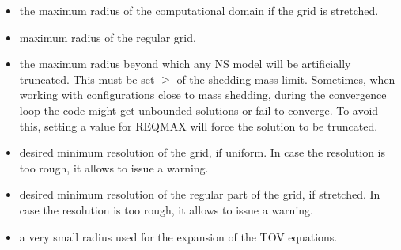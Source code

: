 \documentclass[letterpaper,10pt,english]{sphinxmanual}
\begin{document}
\begin{itemize}
\item {} 
\sphinxAtStartPar
{} \sphinxhyphen{} the maximum radius of the computational domain if the grid is stretched.


\item {} 
\sphinxAtStartPar
{} \sphinxhyphen{} maximum radius of the regular grid.


\item {} 
\sphinxAtStartPar
{} \sphinxhyphen{} the maximum radius beyond which any NS model will be artificially truncated. This must
be set \(\geq\) of the shedding mass limit. Sometimes, when working with configurations close to mass
shedding, during the convergence loop the code might get unbounded solutions or fail to converge. To
avoid this, setting a value for REQMAX will force the solution to be truncated.


\item {} 
\sphinxAtStartPar
{} \sphinxhyphen{} desired minimum resolution of the grid, if uniform. In case the resolution is too rough, it allows to issue a warning.


\item {} 
\sphinxAtStartPar
{} \sphinxhyphen{} desired minimum resolution of the regular part of the grid, if stretched. In case the resolution is too rough, it allows to issue a warning.


\item {} 
\sphinxAtStartPar
{} \sphinxhyphen{} a very small radius used for the expansion of the TOV equations.


\end{itemize}
\end{document}
